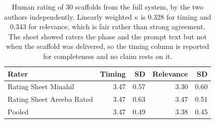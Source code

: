 \begin{table}[t]
\centering
\caption{Human rating of 30 scaffolds from the full system, by the two authors
independently. Linearly weighted $\kappa$ is 0.328 for timing and 0.343 for relevance, which
is fair rather than strong agreement. The sheet showed raters the phase and the prompt
text but not when the scaffold was delivered, so the timing column is reported for
completeness and no claim rests on it.}
\label{tab:ratings}
\begin{tabular}{lrrrr}
\toprule
Rater & Timing & SD & Relevance & SD \\
\midrule
Rating Sheet Minahil & 3.47 & 0.57 & 3.30 & 0.60 \\
Rating Sheet Areeba Rated & 3.47 & 0.63 & 3.47 & 0.51 \\
\midrule
Pooled & 3.47 & 0.49 & 3.38 & 0.45 \\
\bottomrule
\end{tabular}
\end{table}
